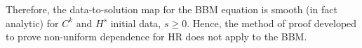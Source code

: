 \documentclass[12pt,reqno]{amsart}
\numberwithin{equation}{section}  %
\begin{document}
%
Therefore, the data-to-solution map for the BBM equation is smooth (in fact
analytic) for $C^{k}$ and $H^{s}$ initial data, $s \ge 0$. Hence, the method of
proof developed to prove
non-uniform dependence for HR does not apply to the BBM.
%
%
%
\nocite{Dieudonne_1969_Foundations-of-}
\nocite{Jost-1998-Postmodern-analysis}
\nocite{Yosida:1980fk}

\end{document}
